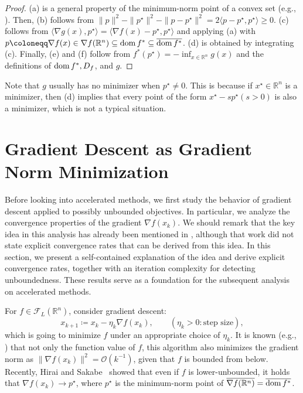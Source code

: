 \documentclass[11pt,a4paper]{article}
\theoremstyle{definition}
\theoremstyle{plain}
\newcommand{\RR}{{\mathbb{R}}}
\newcommand{\dom}{\mathop{\rm dom}}
\begin{document}
\begin{proof}
    (a) is a general property of the minimum-norm point of a convex set (e.g., \cite[Theorem~A.3.1.1]{HL2001}).
    Then, (b) follows from $\|p\|^2 - \|p^\star\|^2 - \|p - p^\star\|^2 = 2\langle p - p^\star, p^\star\rangle \ge 0$.
    (c) follows from $\langle \nabla g(x), p^\star\rangle = \langle \nabla f(x) - p^\star, p^\star\rangle$ and applying (a) with $p \coloneqq \nabla f(x) \in \nabla f(\RR^n) \subseteq \dom f^\ast \subseteq \overline{\dom f^\ast}$.
    (d) is obtained by integrating (c).
    Finally, (e) and (f) follow from $f^\ast(p^\star) = -\inf_{x \in \RR^n}g(x)$ and the definitions of $\dom f^\ast, D_f$, and $g$.
\end{proof}
Note that $g$ usually has no minimizer when $p^\star \neq 0$.
This is because if $x^\star \in \RR^n$ is a minimizer, then (d) implies that every point of the form $x^\star - sp^\star (s > 0)$ is also a minimizer, which is not a typical situation.

\section{Gradient Descent as Gradient Norm Minimization}
\label{sec:gd}
Before looking into accelerated methods, we first study the behavior of gradient descent applied to possibly unbounded objectives.
In particular, we analyze the convergence properties of the gradient $\nabla f(x_k)$.
We should remark that the key idea in this analysis has already been mentioned in \cite{HS2024}, although that work did not state explicit convergence rates that can be derived from this idea.
In this section, we present a self-contained explanation of the idea and derive explicit convergence rates, together with an iteration complexity for detecting unboundedness.
These results serve as a foundation for the subsequent analysis on accelerated methods.

For $f \in \mathcal{F}_L(\RR^n)$, consider gradient descent:
\begin{equation}
    \label{eqn:gd}
    x_{k + 1} \coloneqq x_k - \eta_k\nabla f(x_k), \qquad (\eta_k > 0: \text{step size}),
\end{equation}
which is going to minimize $f$ under an appropriate choice of $\eta_k$.
It is known (e.g., \cite[Equation~(1.2.22)]{Nesterov2018}) that not only the function value of $f$, this algorithm also minimizes the gradient norm as $\|\nabla f(x_k)\|^2 = \mathcal{O}(k^{-1})$, given that $f$ is bounded from below.
Recently, Hirai and Sakabe~\cite[Theorem~3.15]{HS2024} showed that even if $f$ is lower-unbounded, it holds that $\nabla f(x_k) \to p^\star$, where $p^\star$ is the minimum-norm point of $\overline{\nabla f(\RR^n)} = \overline{\dom f^\ast}$.
\end{document}
